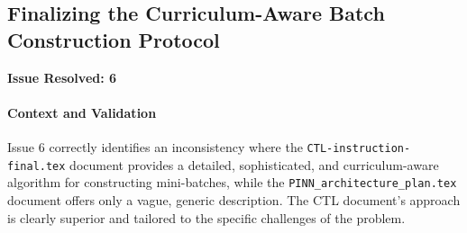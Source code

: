 \documentclass[11pt, a4paper]{article}
\begin{document}
\subsection{Finalizing the Curriculum-Aware Batch Construction Protocol}
\textbf{Issue Resolved: 6}
\paragraph{Context and Validation}
Issue 6 correctly identifies an inconsistency where the \texttt{CTL-instruction-\allowbreak final.tex} document provides a detailed, sophisticated, and curriculum-aware algorithm for constructing mini-batches, while the \texttt{PINN\_\allowbreak architecture\_\allowbreak plan.tex} document offers only a vague, generic description. The CTL document's approach is clearly superior and tailored to the specific challenges of the problem.
\end{document}
